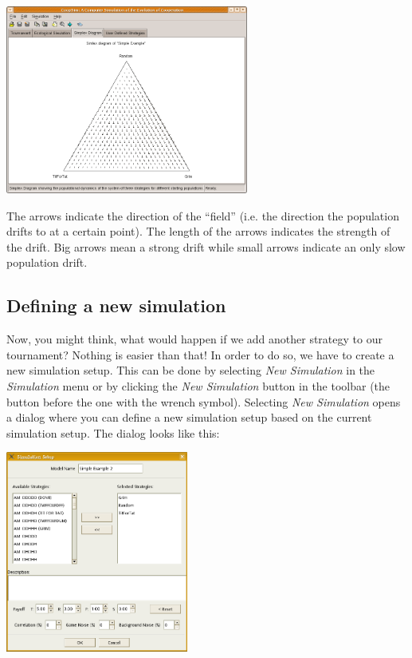 \documentclass[12pt,a4paper,USenglish]{article}
\begin{document}
\begin{center}
\includegraphics[width=8cm,keepaspectratio]{big_images/simplex_page.png}
\end{center}

The arrows indicate the direction of the ``field'' (i.e. the direction
the population drifts to at a certain point). The length of the arrows
indicates the strength of the drift. Big arrows mean a strong drift
while small arrows indicate an only slow population drift.


\subsection{Defining a new simulation}

Now, you might think, what would happen if we add another strategy to
our tournament? Nothing is easier than that! In order to do so, we have
to create a new simulation setup. This can be done by selecting
\emph{New Simulation} in the
\emph{Simulation} menu or by clicking the \emph{New Simulation} button
in the toolbar (the button before the one with the wrench symbol).
Selecting \emph{New Simulation} opens a dialog where you can define a
new simulation setup based on the current simulation setup. The dialog
looks like this:

\begin{center}
\includegraphics[width=6cm,keepaspectratio]{big_images/new_dialog1.png}
\end{center}
\end{document}
